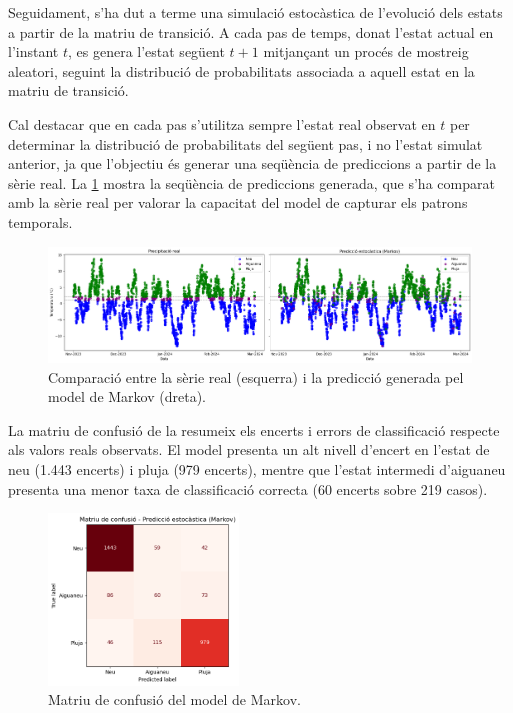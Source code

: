 \documentclass[../main.tex]{subfiles}
\begin{document}
Seguidament, s’ha dut a terme una simulació estocàstica de l’evolució dels estats a partir de la matriu de transició. A cada pas de temps, donat l’estat actual en l’instant \( t \), es genera l’estat següent \( t+1 \) mitjançant un procés de mostreig aleatori, seguint la distribució de probabilitats associada a aquell estat en la matriu de transició. 

Cal destacar que en cada pas s’utilitza sempre l’estat real observat en \( t \) per determinar la distribució de probabilitats del següent pas, i no l’estat simulat anterior, ja que l’objectiu és generar una seqüència de prediccions a partir de la sèrie real. La \cref{fig:markov3} mostra la seqüència de prediccions generada, que s’ha comparat amb la sèrie real per valorar la capacitat del model de capturar els patrons temporals.


\begin{figure}[H]
    \centering
    \includegraphics[width=\textwidth]{figures/markov/3.png}
    \caption{Comparació entre la sèrie real (esquerra) i la predicció generada pel model de Markov (dreta).}
    \label{fig:markov3}
\end{figure}

La matriu de confusió de la  resumeix els encerts i errors de classificació respecte als valors reals observats. El model presenta un alt nivell d’encert en l’estat de neu (1.443 encerts) i pluja (979 encerts), mentre que l’estat intermedi d’aiguaneu presenta una menor taxa de classificació correcta (60 encerts sobre 219 casos).

\begin{figure}[H]
    \centering
    \includegraphics[width=0.45\textwidth]{figures/markov/4.png}
    \caption{Matriu de confusió del model de Markov.}
    \label{fig:markov4}
\end{figure}
\end{document}
